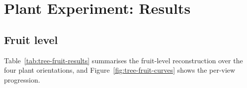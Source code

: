 
\section{Plant Experiment: Results}

\subsection{Fruit level}
\label{sec:tree-results-fruit}

Table~\ref{tab:tree-fruit-results} summarises the fruit-level reconstruction
over the four plant orientations, and
Figure~\ref{fig:tree-fruit-curves} shows the per-view progression.

